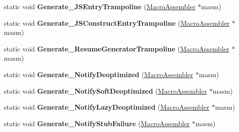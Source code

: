 \begin{DoxyCompactItemize}
\item 
static void {\bfseries Generate\+\_\+\+J\+S\+Entry\+Trampoline} (\hyperlink{classv8_1_1internal_1_1_macro_assembler}{Macro\+Assembler} $\ast$masm)\hypertarget{classv8_1_1internal_1_1_builtins_a49128ad49f0a534e1fe4c6341f863e02}{}\label{classv8_1_1internal_1_1_builtins_a49128ad49f0a534e1fe4c6341f863e02}

\item 
static void {\bfseries Generate\+\_\+\+J\+S\+Construct\+Entry\+Trampoline} (\hyperlink{classv8_1_1internal_1_1_macro_assembler}{Macro\+Assembler} $\ast$masm)\hypertarget{classv8_1_1internal_1_1_builtins_a2598817cf0a9526a6d764d8cce1b9660}{}\label{classv8_1_1internal_1_1_builtins_a2598817cf0a9526a6d764d8cce1b9660}

\item 
static void {\bfseries Generate\+\_\+\+Resume\+Generator\+Trampoline} (\hyperlink{classv8_1_1internal_1_1_macro_assembler}{Macro\+Assembler} $\ast$masm)\hypertarget{classv8_1_1internal_1_1_builtins_a647e8c0c7724b70d5df7561cc40a36af}{}\label{classv8_1_1internal_1_1_builtins_a647e8c0c7724b70d5df7561cc40a36af}

\item 
static void {\bfseries Generate\+\_\+\+Notify\+Deoptimized} (\hyperlink{classv8_1_1internal_1_1_macro_assembler}{Macro\+Assembler} $\ast$masm)\hypertarget{classv8_1_1internal_1_1_builtins_a21a027da2d4f287ca5183fd73273b65a}{}\label{classv8_1_1internal_1_1_builtins_a21a027da2d4f287ca5183fd73273b65a}

\item 
static void {\bfseries Generate\+\_\+\+Notify\+Soft\+Deoptimized} (\hyperlink{classv8_1_1internal_1_1_macro_assembler}{Macro\+Assembler} $\ast$masm)\hypertarget{classv8_1_1internal_1_1_builtins_ab0eb6b926f055873e62bcafdc2df9798}{}\label{classv8_1_1internal_1_1_builtins_ab0eb6b926f055873e62bcafdc2df9798}

\item 
static void {\bfseries Generate\+\_\+\+Notify\+Lazy\+Deoptimized} (\hyperlink{classv8_1_1internal_1_1_macro_assembler}{Macro\+Assembler} $\ast$masm)\hypertarget{classv8_1_1internal_1_1_builtins_a58d08fa3548a2e72798d0deb18f9af33}{}\label{classv8_1_1internal_1_1_builtins_a58d08fa3548a2e72798d0deb18f9af33}

\item 
static void {\bfseries Generate\+\_\+\+Notify\+Stub\+Failure} (\hyperlink{classv8_1_1internal_1_1_macro_assembler}{Macro\+Assembler} $\ast$masm)\hypertarget{classv8_1_1internal_1_1_builtins_ab9af6b4fba6e93088543d7e9d4f64951}{}\label{classv8_1_1internal_1_1_builtins_ab9af6b4fba6e93088543d7e9d4f64951}


\end{DoxyCompactItemize}
